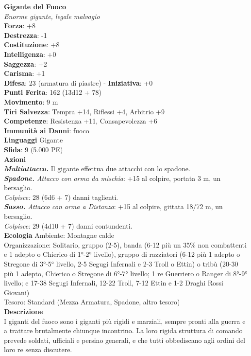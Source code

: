 \begin{multicols}{2}
\medskip\textbf{Gigante del Fuoco}\\
\emph{Enorme gigante, legale malvagio}\\
\textbf{Forza}: +8\\
\textbf{Destrezza}: -1\\
\textbf{Costituzione}: +8\\
\textbf{Intelligenza}: +0\\
\textbf{Saggezza}: +2\\
\textbf{Carisma}: +1\\
\textbf{Difesa}: 23 (armatura di piastre) - \textbf{Iniziativa}: +0\\
\textbf{Punti Ferita}: 162 (13d12 + 78)\\
\textbf{Movimento}: 9 m\\
\textbf{Tiri Salvezza}: Tempra +14, Riflessi +4, Arbitrio +9\\
\textbf{Competenze}: Resistenza +11, Consapevolezza +6\\
\textbf{Immunità ai Danni}: fuoco\\
\textbf{Linguaggi} Gigante\\
\textbf{Sfida}: 9 (5.000 PE)\smallskip\\
\smallskip\textbf{Azioni}\\
\emph{\textbf{Multiattacco.}} Il gigante effettua due attacchi con lo spadone.\\
\emph{\textbf{Spadone.} Attacco con arma da mischia}: +15 al colpire, portata 3 m, un bersaglio.\\
\emph{Colpisce:} 28 (6d6 + 7) danni taglienti.\\
\emph{\textbf{Sasso.} Attacco con arma a Distanza}: +15 al colpire, gittata 18/72 m, un bersaglio.\\
\emph{Colpisce:} 29 (4d10 + 7) danni contundenti. \\
\textbf{Ecologia}
Ambiente: Montagne calde\\
Organizzazione: Solitario, gruppo (2-5), banda (6-12 più un 35\% non combattenti e 1 adepto o Chierico di 1°-2° livello), gruppo di razziatori (6-12 più 1 adepto o Stregone di 3°-5° livello, 2-5 Segugi Infernali e 2-3 Troll o Ettin) o tribù (20-30 più 1 adepto, Chierico o Stregone di 6°-7° livello; 1 re Guerriero o Ranger di 8°-9° livello; e 17-38 Segugi Infernali, 12-22 Troll, 7-12 Ettin e 1-2 Draghi Rossi Giovani)\\
Tesoro: Standard (Mezza Armatura, Spadone, altro tesoro)\\
\textbf{Descrizione}\\
I giganti del fuoco sono i giganti più rigidi e marziali, sempre pronti alla guerra e a trattare brutalmente chiunque incontrino. La loro rigida struttura di comando prevede soldati, ufficiali e persino generali, e che tutti obbediscano agli ordini del loro re senza discutere.\\


\end{multicols}
